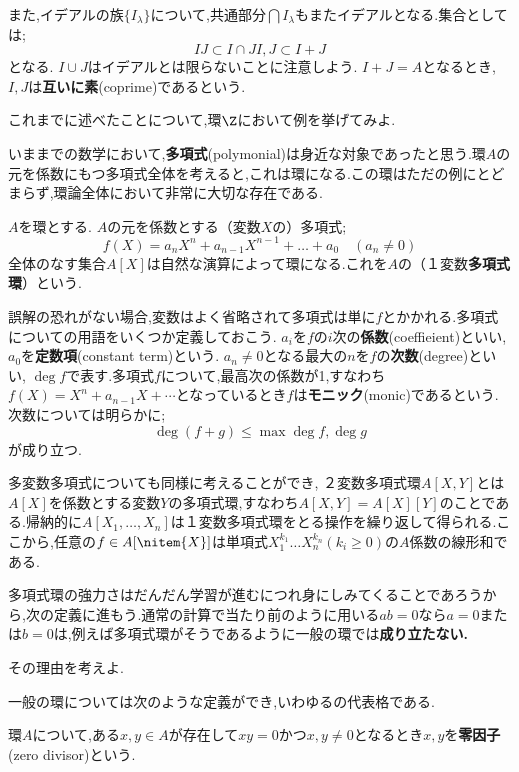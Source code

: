 また,イデアルの族$\{I_\lambda\}$について,共通部分$\bigcap I_\lambda$もまたイデアルとなる.集合としては;
\[IJ\subset I\cap J I,J\subset I+J\]
となる. $I\cup J$はイデアルとは限らないことに注意しよう. $I+J=A$となるとき, $I,J$は\textbf{互いに素}(coprime)であるという.


\begin{exer}
	これまでに述べたことについて,環$\Z$において例を挙げてみよ.
\end{exer}

いままでの数学において,\textbf{多項式}(polymonial)は身近な対象であったと思う.環$A$の元を係数にもつ多項式全体を考えると,これは環になる.この環はただの例にとどまらず,環論全体において非常に大切な存在である.

\begin{defi}[多項式環]
	$A$を環とする. $A$の元を係数とする（変数$X$の）多項式;
	\[f(X)=a_nX^n+a_{n-1}X^{n-1}+\dots+a_0\quad(a_n\neq0)\]
	全体のなす集合$A[X]$は自然な演算によって環になる.これを$A$の（１変数\textbf{多項式環}）という.
\end{defi}
誤解の恐れがない場合,変数はよく省略されて多項式は単に$f$とかかれる.多項式についての用語をいくつか定義しておこう. $a_i$を$f$の$i$次の\textbf{係数}(coeffieient)といい, $a_0$を\textbf{定数項}(constant term)という. $a_n\neq0$となる最大の$n$を$f$の\textbf{次数}(degree)といい, $\deg f$で表す.多項式$f$について,最高次の係数が1,すなわち$f(X)=X^n+a_{n-1}X+\cdots$となっているとき$f$は\textbf{モニック}(monic)であるという. 次数については明らかに;
\[\deg (f+g)\leq\max{\deg f,\deg g}\]
が成り立つ.

多変数多項式についても同様に考えることができ, ２変数多項式環$A[X,Y]$とは$A[X]$を係数とする変数$Y$の多項式環,すなわち$A[X,Y]=A[X][Y]$のことである.帰納的に$A[X_1,\dots,X_n]$は１変数多項式環をとる操作を繰り返して得られる.ここから,任意の$f\in A[\nitem{X}]$は単項式$X_1^{k_1}\dots X_n^{k_n} (k_i\geq0)$の$A$係数の線形和である.

多項式環の強力さはだんだん学習が進むにつれ身にしみてくることであろうから,次の定義に進もう.通常の計算で当たり前のように用いる$ab=0$なら$a=0$または$b=0$は,例えば多項式環がそうであるように一般の環では\textbf{成り立たない.}

\begin{exer}
	その理由を考えよ.
\end{exer}

一般の環については次のような定義ができ,いわゆるの代表格である.

\begin{defi}[零因子]
	環$A$について,ある$x,y\in A$が存在して$xy=0$かつ$x,y\neq0$となるとき$x,y$を\textbf{零因子}(zero divisor)という.
\end{defi}

